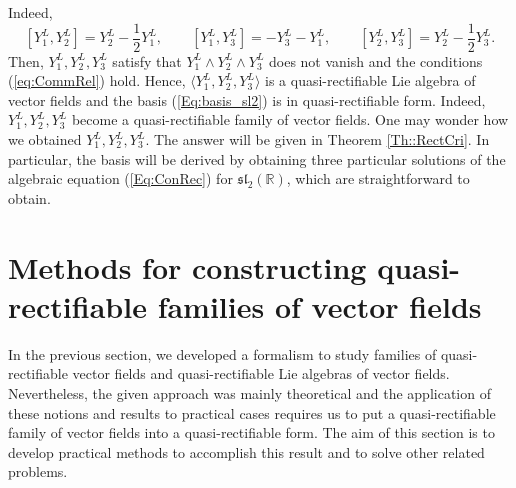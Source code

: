 \documentclass[12pt]{article}
\theoremstyle{plain}
\theoremstyle{definition}
\numberwithin{equation}{section}
\begin{document}
  Indeed,
  \begin{equation}\label{Eq:ComRel}
  [Y_1^L,Y_2^L]=Y_2^L-\frac 1 2Y_1^L,\qquad [Y_1^L,Y_3^L]=-Y_3^L-Y_1^L,\qquad [Y_2^L,Y_3^L]=Y_2^L-\frac 1 2Y^L_3.
  \end{equation}Then, $Y_1^L,Y_2^L,Y_3^L$ satisfy that $Y_1^L\wedge Y_2^L\wedge Y_3^L$ does not vanish and the conditions (\ref{eq:CommRel}) hold. Hence, $\langle Y_1^L,Y_2^L,Y_3^L\rangle$ is a quasi-rectifiable Lie algebra of vector fields and the basis (\ref{Eq:basis_sl2}) is in quasi-rectifiable form. Indeed, $Y_1^L,Y_2^L,Y_3^L$ become a quasi-rectifiable family of vector fields. One may wonder how we obtained $Y_1^L,Y^L_2,Y^L_3$. The answer will be  given in Theorem \ref{Th::RectCri}. In particular, the basis will be derived by obtaining three particular solutions of the algebraic equation (\ref{Eq:ConRec}) for $\mathfrak{sl}_2(\mathbb{R})$, which are straightforward to obtain.
\section{Methods for constructing quasi-rectifiable families of vector fields}\label{Sec:Direct}

In the previous section, we developed a formalism to study families of quasi-rectifiable vector fields and quasi-rectifiable Lie algebras of vector fields. Nevertheless, the given approach was mainly theoretical and the application of these notions and results to practical cases requires us to put a quasi-rectifiable family of vector fields into a quasi-rectifiable form. The aim of this section is to develop practical methods to accomplish this result and to solve other related problems.  
\end{document}
